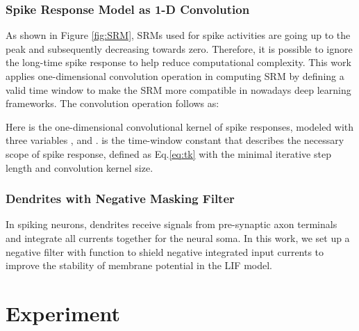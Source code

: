 \documentclass{article}
\begin{document}
\subsubsection{Spike Response Model as 1-D Convolution}
As shown in Figure \ref{fig:SRM}, SRMs used for spike activities are going up to the peak and subsequently decreasing towards zero.
Therefore, it is possible to ignore the long-time spike response to help reduce computational complexity. This work applies one-dimensional convolution operation in computing SRM by defining a valid time window  to make the SRM more compatible in nowadays deep learning frameworks. The convolution operation follows as:







Here  is the one-dimensional convolutional kernel of spike responses, modeled with three variables ,  and .  is the time-window constant that describes the necessary scope of spike response, defined as Eq.\ref{eq:tk} with the minimal iterative step length  and convolution kernel size. 


























\subsubsection{Dendrites with Negative Masking Filter}

In spiking neurons, dendrites receive signals from pre-synaptic axon terminals and integrate all currents together for the neural soma. In this work, we set up a negative filter with  function \cite{ramachandran_searching_2018} to shield negative integrated input currents to improve the stability of membrane potential in the LIF model.














\section{Experiment}
\end{document}
